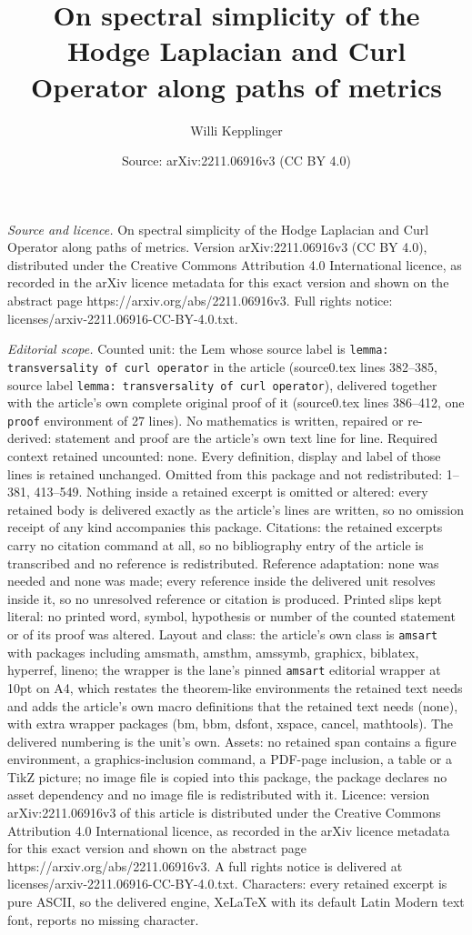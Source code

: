 \documentclass[10pt,a4paper]{amsart}
\title[On spectral simplicity of the Hodge Laplacian and Curl Opera]{On spectral simplicity of the Hodge Laplacian and Curl Operator along paths of metrics}
\author{Willi Kepplinger}
\date{Source: arXiv:2211.06916v3 (CC BY 4.0)}
\begin{document}
\maketitle

\noindent\emph{Source and licence.} On spectral simplicity of the Hodge Laplacian and Curl Operator along paths of metrics. Version arXiv:2211.06916v3 (CC BY 4.0), distributed under the Creative Commons Attribution 4.0 International licence, as recorded in the arXiv licence metadata for this exact version and shown on the abstract page https://arxiv.org/abs/2211.06916v3. Full rights notice: licenses/arxiv-2211.06916-CC-BY-4.0.txt.\par\smallskip

\noindent\textit{Editorial scope.} Counted unit: the Lem whose source label is \texttt{lemma: transversality of curl operator} in the article (source0.tex lines 382--385, source label \texttt{lemma: transversality of curl operator}), delivered together with the article's own complete original proof of it (source0.tex lines 386--412, one \texttt{proof} environment of 27 lines). No mathematics is written, repaired or re-derived: statement and proof are the article's own text line for line. Required context retained uncounted: none. Every definition, display and label of those lines is retained unchanged. Omitted from this package and not redistributed: 1--381, 413--549. Nothing inside a retained excerpt is omitted or altered: every retained body is delivered exactly as the article's lines are written, so no omission receipt of any kind accompanies this package. Citations: the retained excerpts carry no citation command at all, so no bibliography entry of the article is transcribed and no reference is redistributed. Reference adaptation: none was needed and none was made; every reference inside the delivered unit resolves inside it, so no unresolved reference or citation is produced. Printed slips kept literal: no printed word, symbol, hypothesis or number of the counted statement or of its proof was altered. Layout and class: the article's own class is \texttt{amsart} with packages including amsmath, amsthm, amssymb, graphicx, biblatex, hyperref, lineno; the wrapper is the lane's pinned \texttt{amsart} editorial wrapper at 10pt on A4, which restates the theorem-like environments the retained text needs and adds the article's own macro definitions that the retained text needs (none), with extra wrapper packages (bm, bbm, dsfont, xspace, cancel, mathtools). The delivered numbering is the unit's own. Assets: no retained span contains a figure environment, a graphics-inclusion command, a PDF-page inclusion, a table or a TikZ picture; no image file is copied into this package, the package declares no asset dependency and no image file is redistributed with it. Licence: version arXiv:2211.06916v3 of this article is distributed under the Creative Commons Attribution 4.0 International licence, as recorded in the arXiv licence metadata for this exact version and shown on the abstract page https://arxiv.org/abs/2211.06916v3. A full rights notice is delivered at licenses/arxiv-2211.06916-CC-BY-4.0.txt. Characters: every retained excerpt is pure ASCII, so the delivered engine, XeLaTeX with its default Latin Modern text font, reports no missing character.
\end{document}
